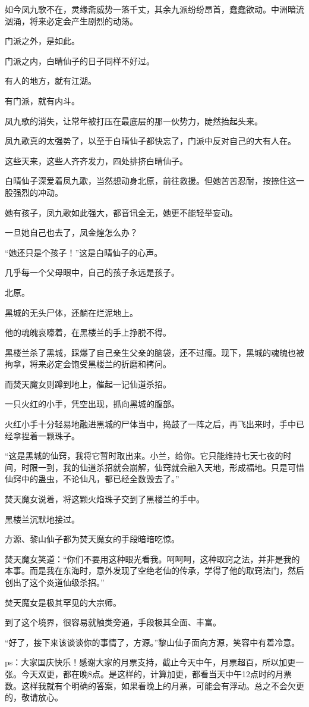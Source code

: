 \begin{this_body}
如今凤九歌不在，灵缘斋威势一落千丈，其余九派纷纷昂首，蠢蠢欲动。中洲暗流汹涌，将来必定会产生剧烈的动荡。

门派之外，是如此。

门派之内，白晴仙子的日子同样不好过。

有人的地方，就有江湖。

有门派，就有内斗。

凤九歌的消失，让常年被打压在最底层的那一伙势力，陡然抬起头来。

凤九歌真的太强势了，以至于白晴仙子都快忘了，门派中反对自己的大有人在。

这些天来，这些人齐齐发力，四处排挤白晴仙子。

白晴仙子深爱着凤九歌，当然想动身北原，前往救援。但她苦苦忍耐，按捺住这一股强烈的冲动。

她有孩子，凤九歌如此强大，都音讯全无，她更不能轻举妄动。

一旦她自己也去了，凤金煌怎么办？

“她还只是个孩子！”这是白晴仙子的心声。

几乎每一个父母眼中，自己的孩子永远是孩子。

北原。

黑城的无头尸体，还躺在烂泥地上。

他的魂魄哀嚎着，在黑楼兰的手上挣脱不得。

黑楼兰杀了黑城，踩爆了自己亲生父亲的脑袋，还不过瘾。现下，黑城的魂魄也被拘拿，将来必定会饱受黑楼兰的折磨和拷问。

而焚天魔女则蹲到地上，催起一记仙道杀招。

一只火红的小手，凭空出现，抓向黑城的腹部。

火红小手十分轻易地融进黑城的尸体当中，捣鼓了一阵之后，再飞出来时，手中已经拿捏着一颗珠子。

“这是黑城的仙窍，我将它暂时取出来。小兰，给你。它只能维持七天七夜的时间，时限一到，我的仙道杀招就会崩解，仙窍就会融入天地，形成福地。只是可惜仙窍中的蛊虫，不论仙凡，都已经全数毁去了。”

焚天魔女说着，将这颗火焰珠子交到了黑楼兰的手中。

黑楼兰沉默地接过。

方源、黎山仙子都为焚天魔女的手段暗暗吃惊。

焚天魔女笑道：“你们不要用这种眼光看我。呵呵呵，这种取窍之法，并非是我的本事。而是我在东海时，意外发现了空绝老仙的传承，学得了他的取窍法门，然后创出了这个炎道仙级杀招。”

焚天魔女是极其罕见的大宗师。

到了这个境界，很容易就触类旁通，手段极其全面、丰富。

“好了，接下来该谈谈你的事情了，方源。”黎山仙子面向方源，笑容中有着冷意。

ps：大家国庆快乐！感谢大家的月票支持，截止今天中午，月票超百，所以加更一张。今天双更，都在晚8点。是这样的，计算加更，都看当天中午12点时的月票数。这样我就有个明确的答案，如果看晚上的月票，可能会有浮动。总之不会欠更的，敬请放心。

\end{this_body}


